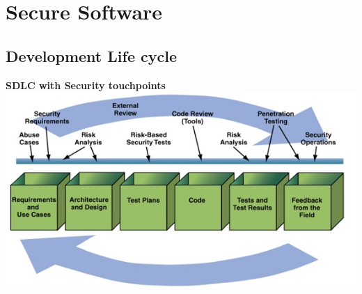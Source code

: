 \documentclass[10pt,a4paper,final]{report}
\author{Gérard Tio Nogueras}
\begin{document}
\chapter{Secure Software}
\section{Development Life cycle}
\textbf{SDLC with Security touchpoints}\\
\includegraphics[scale=.65]{cycle.jpg}
\end{document}
